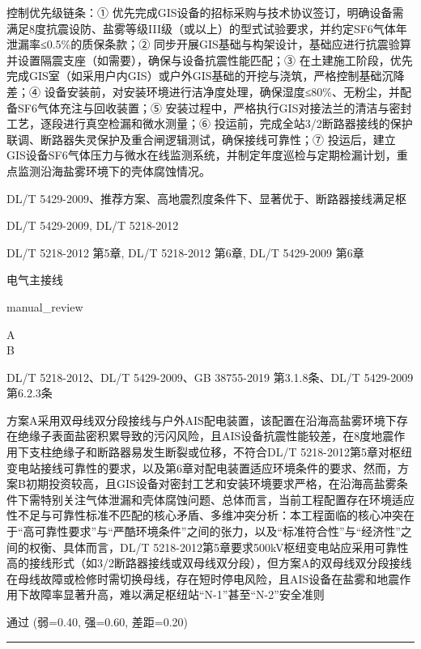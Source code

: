 \documentclass[11pt,a4paper]{ctexart}
\begin{document}
\begin{description}[leftmargin=1.5em,style=nextline,font=\normalfont]
控制优先级链条：① 优先完成GIS设备的招标采购与技术协议签订，明确设备需满足8度抗震设防、盐雾等级III级（或以上）的型式试验要求，并约定SF6气体年泄漏率≤0.5\%的质保条款；② 同步开展GIS基础与构架设计，基础应进行抗震验算并设置隔震支座（如需要），确保与设备抗震性能匹配；③ 在土建施工阶段，优先完成GIS室（如采用户内GIS）或户外GIS基础的开挖与浇筑，严格控制基础沉降差；④ 设备安装前，对安装环境进行洁净度处理，确保湿度≤80\%、无粉尘，并配备SF6气体充注与回收装置；⑤ 安装过程中，严格执行GIS对接法兰的清洁与密封工艺，逐段进行真空检漏和微水测量；⑥ 投运前，完成全站3/2断路器接线的保护联调、断路器失灵保护及重合闸逻辑测试，确保接线可靠性；⑦ 投运后，建立GIS设备SF6气体压力与微水在线监测系统，并制定年度巡检与定期检漏计划，重点监测沿海盐雾环境下的壳体腐蚀情况。
  \item[KW:] DL/T 5429-2009、推荐方案、高地震烈度条件下、显著优于、断路器接线满足枢
  \item[标准:] DL/T 5429-2009, DL/T 5218-2012
  \item[条款溯源:] DL/T 5218-2012 第5章, DL/T 5218-2012 第6章, DL/T 5429-2009 第6章
  \item[主题:] 电气主接线
  \item[评分方式:] manual\_review
  \item[选项:] A \\ B
  \item[Rubric条款:] DL/T 5218-2012、DL/T 5429-2009、GB 38755-2019 第3.1.8条、DL/T 5429-2009 第6.2.3条
  \item[Rubric判据:] 方案A采用双母线双分段接线与户外AIS配电装置，该配置在沿海高盐雾环境下存在绝缘子表面盐密积累导致的污闪风险，且AIS设备抗震性能较差，在8度地震作用下支柱绝缘子和断路器易发生断裂或位移，不符合DL/T 5218-2012第5章对枢纽变电站接线可靠性的要求，以及第6章对配电装置适应环境条件的要求、然而，方案B初期投资较高，且GIS设备对密封工艺和安装环境要求严格，在沿海高盐雾条件下需特别关注气体泄漏和壳体腐蚀问题、总体而言，当前工程配置存在环境适应性不足与可靠性标准不匹配的核心矛盾、多维冲突分析：本工程面临的核心冲突在于“高可靠性要求”与“严酷环境条件”之间的张力，以及“标准符合性”与“经济性”之间的权衡、具体而言，DL/T 5218-2012第5章要求500kV枢纽变电站应采用可靠性高的接线形式（如3/2断路器接线或双母线双分段），但方案A的双母线双分段接线在母线故障或检修时需切换母线，存在短时停电风险，且AIS设备在盐雾和地震作用下故障率显著升高，难以满足枢纽站“N-1”甚至“N-2”安全准则
  \item[LJ判定:] 通过 (弱=0.40, 强=0.60, 差距=0.20)
\end{description}
\vspace{4pt}
\hrule
\vspace{6pt}
\end{document}
